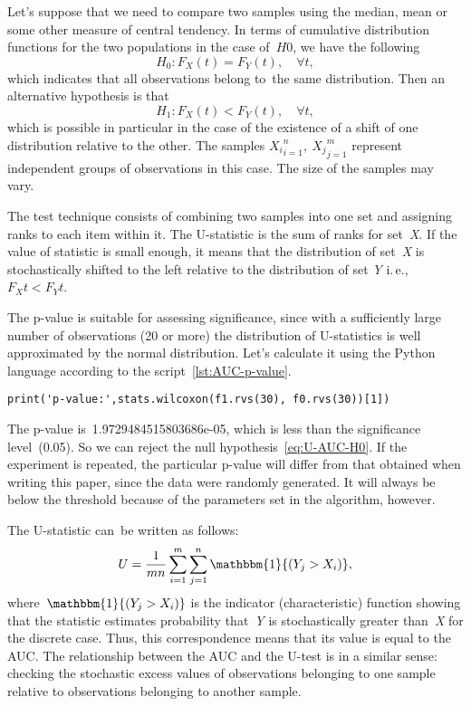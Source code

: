\documentclass[]{scrreprt}
\begin{document}
Let's suppose that we need to compare two samples using the median, mean or some other measure of central tendency. In terms of cumulative distribution functions for the two populations in the case of~$H0$, we have the following
\begin{equation}\label{eq:U-AUC-H0}
H_0: F_{X}(t) = F_{Y}(t), \quad \forall t,
\end{equation}
which indicates that all observations belong to~the same distribution. Then an alternative hypothesis is that
\begin{equation}\label{eq:U-AUC-H1}
H_1: F_{X}(t) < F_{Y}(t), \quad \forall t,
\end{equation}
which is possible in particular in the case of the existence of a shift of one distribution relative to the other. The samples ${X_{i}}_{i=1}^{n},\ {X_{j}}_{j=1}^{m}$ represent independent groups of observations in this case. The size of the samples may vary.

The test technique consists of combining two samples into one set and assigning ranks to each item within it. The U-statistic is the sum of ranks for set~\textit{X}. If the value of statistic is small enough, it means that the distribution of set~\textit{X} is stochastically shifted to the left relative to the distribution of set \textit{Y} i.\,e.,~$F_{X}{t} < F_{Y}{t}$.

The p-value is suitable for assessing significance, since with a sufficiently large number of observations (20 or more) the distribution of U-statistics is well approximated by the normal distribution. Let's calculate it using the Python language according to the script~\ref{lst:AUC-p-value}.
%
\begin{lstlisting}[float=htp, caption = Calculation of~the p-value for the test data, firstnumber=1, label= lst:AUC-p-value]
print('p-value:',stats.wilcoxon(f1.rvs(30), f0.rvs(30))[1])

\end{lstlisting}
The p-value is~1.9729484515803686e-05, which is less than the significance level~(0.05). So we can reject the null hypothesis~\ref{eq:U-AUC-H0}. If the experiment is repeated, the particular p-value will differ from that obtained when writing this paper, since the data were randomly generated. It will always be below the threshold because of the parameters set in the algorithm, however.

The U-statistic can~be written as follows:
\begin{equation}\label{eq:U-statistics}
U = \frac{1}{mn}\sum_{i=1}^{m}\sum_{j=1}^{n}\mathbbm{1}{(Y_{j}>X_{i})},
\end{equation}
where~$\mathbbm{1}{(Y_{j}>X_{i})}$ is the indicator (characteristic) function showing that the statistic  estimates probability that~\textit{Y} is stochastically greater than~\textit{X} for the discrete case. Thus, this correspondence means that its value is equal to the AUC. The relationship between the AUC and the U-test is in a similar sense: checking the stochastic excess values of observations belonging to one sample relative to observations belonging to another sample.
%
\end{document}
